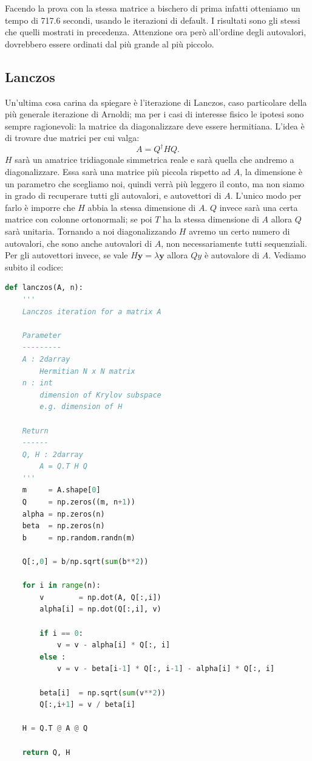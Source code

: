 \documentclass[10pt,a4paper]{article}
\begin{document}
Facendo la prova con la stessa matrice a bischero di prima infatti otteniamo un tempo di 717.6 secondi, usando le iterazioni di default. I risultati sono gli stessi che quelli mostrati in precedenza. Attenzione ora però all'ordine degli autovalori, dovrebbero essere ordinati dal più grande al più piccolo.
\subsection{Lanczos}
Un'ultima cosa carina da spiegare è l'iterazione di Lanczos, caso particolare della più generale iterazione di Arnoldi; ma per i casi di interesse fisico le ipotesi sono sempre ragionevoli: la matrice da diagonalizzare deve essere hermitiana. L'idea è di trovare due matrici per cui valga:
\begin{equation}
A = Q^{\dagger} H Q .
\end{equation}
$H$ sarà un amatrice tridiagonale simmetrica reale e sarà quella che andremo a diagonalizzare. Essa sarà una matrice più piccola rispetto ad $A$, la dimensione è un parametro che scegliamo noi, quindi verrà più leggero il conto, ma non siamo in grado di recuperare tutti gli autovalori, e autovettori di $A$. L'unico modo per farlo è imporre che $H$ abbia la stessa dimensione di $A$. $Q$ invece sarà una certa matrice con colonne ortonormali; se poi $T$ ha la stessa dimensione di $A$ allora $Q$ sarà unitaria. Tornando a noi diagonalizzando $H$ avremo un certo numero di autovalori, che sono anche autovalori di $A$, non necessariamente tutti sequenziali. Per gli autovettori invece, se vale $H \textbf{y}= \lambda \textbf{y}$ allora $Q y$ è autovalore di $A$.
Vediamo subito il codice:
\begin{lstlisting}[language=Python]
def lanczos(A, n):
    '''
    Lanczos iteration for a matrix A
    
    Parameter
    ---------
    A : 2darray
        Hermitian N x N matrix
    n : int
        dimension of Krylov subspace
        e.g. dimension of H
    
    Return
    ------
    Q, H : 2darray
        A = Q.T H Q
    '''
    m     = A.shape[0]
    Q     = np.zeros((m, n+1))
    alpha = np.zeros(n)
    beta  = np.zeros(n)
    b     = np.random.randn(m)
    
    Q[:,0] = b/np.sqrt(sum(b**2))
    
    for i in range(n):
        v        = np.dot(A, Q[:,i])
        alpha[i] = np.dot(Q[:,i], v)
        
        if i == 0:
            v = v - alpha[i] * Q[:, i]
        else :
            v = v - beta[i-1] * Q[:, i-1] - alpha[i] * Q[:, i]
        
        beta[i]  = np.sqrt(sum(v**2))
        Q[:,i+1] = v / beta[i]
    
    H = Q.T @ A @ Q
    
    return Q, H
\end{lstlisting}
\end{document}
